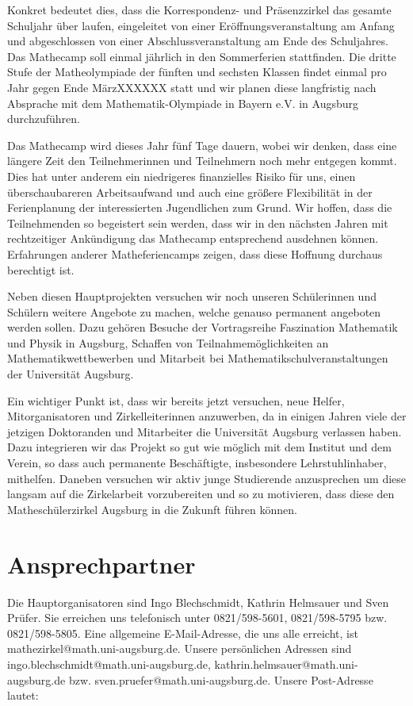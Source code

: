 \documentclass[12pt]{zettel}
\begin{document}
Konkret bedeutet dies, dass die Korrespondenz- und Präsenzzirkel das
gesamte Schuljahr über laufen, eingeleitet von einer
Eröffnungsveranstaltung am Anfang und abgeschlossen von einer
Abschlussveranstaltung am Ende des Schuljahres. Das Mathecamp soll
einmal jährlich in den Sommerferien stattfinden. Die dritte Stufe der
Matheolympiade der fünften und sechsten Klassen findet einmal pro Jahr
gegen Ende MärzXXXXXX statt und wir planen diese langfristig nach
Absprache mit dem Mathematik-Olympiade in Bayern e.V. in Augsburg
durchzuführen.

Das Mathecamp wird dieses Jahr fünf Tage dauern, wobei wir denken, dass
eine längere Zeit den Teilnehmerinnen und Teilnehmern noch mehr entgegen
kommt. Dies hat unter anderem ein niedrigeres finanzielles Risiko für
uns, einen überschaubareren Arbeitsaufwand und auch eine größere
Flexibilität in der Ferienplanung der interessierten Jugendlichen zum
Grund. Wir hoffen, dass die Teilnehmenden so begeistert sein werden,
dass wir in den nächsten Jahren mit rechtzeitiger Ankündigung das
Mathecamp entsprechend ausdehnen können. Erfahrungen anderer
Matheferiencamps zeigen, dass diese Hoffnung durchaus berechtigt ist.

Neben diesen Hauptprojekten versuchen wir noch unseren Schülerinnen und
Schülern weitere Angebote zu machen, welche genauso permanent angeboten
werden sollen. Dazu gehören Besuche der Vortragsreihe Faszination
Mathematik und Physik in Augsburg, Schaffen von Teilnahmemöglichkeiten
an Mathematikwettbewerben und Mitarbeit bei
Mathematikschulveranstaltungen der Universität Augsburg.

Ein wichtiger Punkt ist, dass wir bereits jetzt versuchen, neue Helfer,
Mitorganisatoren und Zirkelleiterinnen anzuwerben, da in einigen Jahren
viele der jetzigen Doktoranden und Mitarbeiter die Universität Augsburg
verlassen haben. Dazu integrieren wir das Projekt so gut wie möglich mit
dem Institut und dem Verein, so dass auch permanente Beschäftigte,
insbesondere Lehrstuhlinhaber, mithelfen. Daneben versuchen wir aktiv
junge Studierende anzusprechen um diese langsam auf die Zirkelarbeit
vorzubereiten und so zu motivieren, dass diese den Matheschülerzirkel
Augsburg in die Zukunft führen können.


\section{Ansprechpartner}

Die Hauptorganisatoren sind Ingo Blechschmidt, Kathrin Helmsauer und Sven
Prüfer. Sie erreichen uns telefonisch unter 0821/598-5601, 0821/598-5795 bzw.
0821/598-5805. Eine allgemeine E-Mail-Adresse, die uns alle erreicht, ist
\textsf{mathezirkel@math.uni-augsburg.de}. Unsere persönlichen Adressen sind
\textsf{ingo.blechschmidt@math.uni-augsburg.de},
\textsf{kathrin.helmsauer@math.uni-augsburg.de} bzw.
\textsf{sven.pruefer@math.uni-augsburg.de}. Unsere Post-Adresse lautet:
\end{document}
